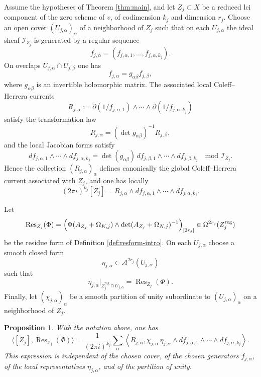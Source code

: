 \documentclass[12pt,a4paper,dvipsnames,x11names]{amsart}
\numberwithin{equation}{section}
\theoremstyle{plain}
\newtheorem{proposition}[theorem]{Proposition}
\theoremstyle{definition}
\theoremstyle{remark}
\newcommand{\reg}{\mathrm{reg}}
\begin{document}
Assume the hypotheses of Theorem \ref{thm:main}, and let $Z_j\subset X$ be a reduced lci component of the zero scheme of $v$, of codimension $k_j$ and dimension $r_j$. Choose an open cover $(U_{j,\alpha})_\alpha$ of a neighborhood of $Z_j$ such that on each $U_{j,\alpha}$ the ideal sheaf $\mathcal I_{Z_j}$ is generated by a regular sequence
$$
f_{j,\alpha}=(f_{j,\alpha,1},\dots,f_{j,\alpha,k_j}).
$$
On overlaps $U_{j,\alpha}\cap U_{j,\beta}$ one has
$$
f_{j,\alpha}=g_{\alpha\beta}f_{j,\beta},
$$
where $g_{\alpha\beta}$ is an invertible holomorphic matrix. The associated local Coleff--Herrera currents
\begin{equation}\label{eq:CH-local-current}
R_{j,\alpha}
:=
\bar\partial(1/f_{j,\alpha,1})\wedge\cdots\wedge\bar\partial(1/f_{j,\alpha,k_j})
\end{equation}
satisfy the transformation law
$$
R_{j,\alpha}=(\det g_{\alpha\beta})^{-1}R_{j,\beta},
$$
and the local Jacobian forms satisfy
$$
df_{j,\alpha,1}\wedge\cdots\wedge df_{j,\alpha,k_j}
=
\det(g_{\alpha\beta})\,
df_{j,\beta,1}\wedge\cdots\wedge df_{j,\beta,k_j}
\quad \text{mod } \mathcal I_{Z_j}.
$$
Hence the collection $(R_{j,\alpha})_\alpha$ defines canonically the global Coleff--Herrera current associated with $Z_j$, and one has locally
\begin{equation}\label{eq:CH-PL-local}
(2\pi i)^{k_j}[Z_j]
=
R_{j,\alpha}\wedge df_{j,\alpha,1}\wedge\cdots\wedge df_{j,\alpha,k_j}.
\end{equation}

Let
$$
\operatorname{Res}_{Z_j}(\Phi)
=
\Bigl(\Phi(A_{Z_j}+\Omega_{K,j})\wedge \det(A_{Z_j}+\Omega_{N,j})^{-1}\Bigr)_{[2r_j]}
\in \Omega^{2r_j}(Z_j^{\reg})
$$
be the residue form of Definition \ref{def:resform-intro}. On each $U_{j,\alpha}$ choose a smooth closed form
$$
\eta_{j,\alpha}\in \mathscr A^{2r_j}(U_{j,\alpha})
$$
such that
$$
\eta_{j,\alpha}|_{Z_j^{\reg}\cap U_{j,\alpha}}
=
\operatorname{Res}_{Z_j}(\Phi).
$$
Finally, let $(\chi_{j,\alpha})_\alpha$ be a smooth partition of unity subordinate to $(U_{j,\alpha})_\alpha$ on a neighborhood of $Z_j$.

\begin{proposition}\label{prop:CH-local-form}
With the notation above, one has
\begin{equation}\label{eq:CH-local-form}
\langle [Z_j],\operatorname{Res}_{Z_j}(\Phi)\rangle
=
\frac{1}{(2\pi i)^{k_j}}
\sum_\alpha
\left\langle
R_{j,\alpha},
\chi_{j,\alpha}\,\eta_{j,\alpha}\wedge
df_{j,\alpha,1}\wedge\cdots\wedge df_{j,\alpha,k_j}
\right\rangle.
\end{equation}
This expression is independent of the chosen cover, of the chosen generators $f_{j,\alpha}$, of the local representatives $\eta_{j,\alpha}$, and of the partition of unity.
\end{proposition}
\end{document}
